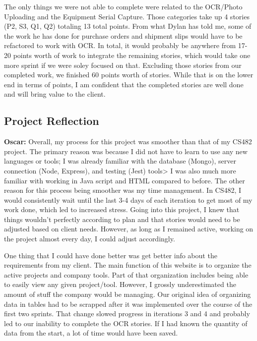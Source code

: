 \documentclass{article}
\begin{document}
The only things we were not able to complete were related to the OCR/Photo Uploading and the Equipment Serial Capture. Those categories take up 4 stories (P2, S3, Q1, Q2) totaling 13 total points. From what Dylan has told me, some of the work he has done for purchase orders and shipment slips would have to be refactored to work with OCR. In total, it would probably be anywhere from 17-20 points worth of work to integrate the remaining stories, which would take one more sprint if we were soley focused on that. Excluding those stories from our completed work, we finished 60 points worth of stories. While that is on the lower end in terms of points, I am confident that the completed stories are well done and will bring value to the client. 

\subsection{Project Reflection}

\textbf{Oscar: } Overall, my process for this project was smoother than that of my CS482 project. The primary reason was because I did not have to learn to use any new languages or tools; I was already familiar with the database (Mongo), server connection (Node, Express), and testing (Jest) tools> I was also much more familiar with working in Java script and HTML compared to before. The other reason for this process being smoother was my time management. In CS482, I would consistently wait until the last 3-4 days of each iteration to get most of my work done, which led to increased stress. Going into this project, I knew that things wouldn't perfectly according to plan and that stories would need to be adjusted based on client needs. However, as long as I remained active, working on the project almost every day, I could adjust accordingly. 

One thing that I could have done better was get better info about the requirements from my client. The main function of this website is to organize the active projects and company tools. Part of that organization includes being able to easily view any given project/tool. However, I grossly underestimated the amount of stuff the company would be managing. Our original idea of organizing data in tables had to be scrapped after it was implemented over the course of the first two sprints. That change slowed progress in iterations 3 and 4 and probably led to our inability to complete the OCR stories. If I had known the quantity of data from the start, a lot of time would have been saved. 
\end{document}
